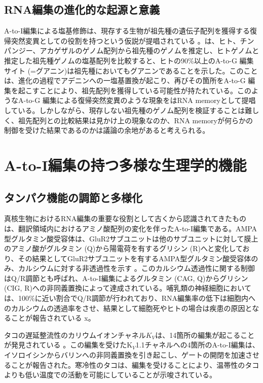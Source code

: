 \subsection{RNA編集の進化的な起源と意義}
A-to-I編集による塩基修飾は、現存する生物が祖先種の遺伝子配列を獲得する復帰突然変異としての役割を持つという仮説が提唱されている \citep{Che1307, Pinto:2014aa}。\cite{Che1307}は、ヒト、チンパンジー、アカゲザルのゲノム配列から祖先種のゲノムを推定し、ヒトゲノムと推定した祖先種ゲノムの塩基配列を比較すると、ヒトの90\%以上のA-to-G 編集サイト (=グアニン)は祖先種においてもグアニンであることを示した。このことは、進化の過程でアデニンへの一塩基置換が起こり、再びその箇所をA-to-G 編集を起こすことにより、祖先配列を獲得している可能性が持たれている。このようなA-to-G 編集による復帰突然変異のような現象を\cite{Che1307}はRNA memoryとして提唱している。しかしながら、現存しない祖先種のゲノム配列を検証することは難しく、祖先配列との比較結果は見かけ上の現象なのか、RNA memoryが何らかの制御を受けた結果であるのかは議論の余地があると考えられる。

\section{A-to-I編集の持つ多様な生理学的機能}
\subsection{タンパク機能の調節と多様化}
真核生物におけるRNA編集の重要な役割として古くから認識されてきたものは、翻訳領域内におけるアミノ酸配列の変化を伴ったA-to-I編集である。AMPA型グルタミン酸受容体は、GluR2サブユニットは他のサブユニットに対して膜上のアミノ酸がグルタミン (Q)から陽電荷を有するグリシン (R)へと変化しており、その結果としてGluR2サブユニットを有するAMPA型グルタミン酸受容体のみ、カルシウムに対する非透過性を示す \citep{HigSinKoh9312}。このカルシウム透過性に関する制御はQ/R調節とも呼ばれ、A-to-I編集によるグルタミン (CAG, Q)からグリシン (CIG, R)への非同義置換によって達成されている。哺乳類の神経細胞においては、100\%に近い割合でQ/R調節が行われており、RNA編集率の低下は細胞内へのカルシウムの透過率をさせ、結果として細胞死やヒトの場合は疾患の原因となることが報告されている \citep{Slotkin:2013aa}x。
\par
タコの遅延整流性のカリウムイオンチャネル$K_{V}$は、14箇所の編集が起こることが発見されている \citep{Garrett:2012aa}。この編集を受けたK$_{V}$1.1チャネルへの4箇所のA-to-I編集は、イソロイシンからバリンへの非同義置換を引き起こし、ゲートの開閉を加速させることが報告された。寒冷性のタコは、編集を受けることにより、温帯性のタコよりも低い温度での活動を可能にしていることが示唆されている。

